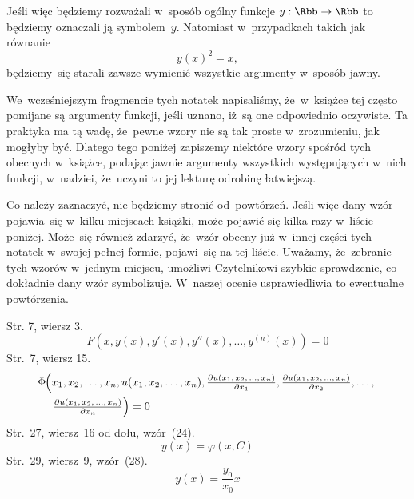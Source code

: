 \documentclass[a4paper,11pt]{article}
\numberwithin{equation}{section}
\begin{document}
Jeśli więc będziemy rozważali w~sposób ogólny funkcje
$y : \Rbb \to \Rbb$ to będziemy oznaczali ją symbolem~$y$. Natomiast
w~przypadkach takich jak równanie
\begin{equation}
  \label{eq:Uwagi-ogolne-03}
  y( x )^{ 2 } = x,
\end{equation}
będziemy~się starali zawsze wymienić wszystkie argumenty w~sposób jawny.

\VerSpaceFour





\noindent
We~wcześniejszym fragmencie tych notatek napisaliśmy, że~w~książce tej
często pomijane są argumenty funkcji, jeśli uznano, iż~są one odpowiednio
oczywiste. Ta praktyka ma tą wadę, że~pewne wzory nie są tak proste
w~zrozumieniu, jak mogłyby być. Dlatego tego poniżej zapiszemy niektóre
wzory spośród tych obecnych w~książce, podając jawnie argumenty wszystkich
występujących w~nich funkcji, w~nadziei, że~uczyni to jej lekturę odrobinę
łatwiejszą.

Co należy zaznaczyć, nie będziemy stronić od~powtórzeń. Jeśli więc dany
wzór pojawia~się w~kilku miejscach książki, może pojawić się kilka razy
w~liście poniżej. Może~się również zdarzyć, że~wzór obecny już w~innej
części tych notatek w~swojej pełnej formie, pojawi~się na tej liście.
Uważamy, że~zebranie tych wzorów w~jednym miejscu, umożliwi Czytelnikowi
szybkie sprawdzenie, co dokładnie dany wzór symbolizuje. W~naszej ocenie
usprawiedliwia to ewentualne powtórzenia.

\VerSpaceTwo


\noindent
Str. 7, wiersz 3.
\begin{equation}
  \label{eq:Uwagi-ogolne-04}
  F\left( x, y( x ), y'( x ), y''( x ), \ldots, y^{ ( n ) }( x ) \right) = 0
\end{equation}
Str.~7, wiersz 15.
\begin{equation}
  \label{eq:Uwagi-ogolne-05}
  \begin{split}
    \Phi \hspace{-0.25em}
    &\left( x_{ 1 }, x_{ 2 }, \ldots, x_{ n },
      u( x_{ 1 }, x_{ 2 }, \ldots, x_{ n } ),
      \tfrac{ \partial u( x_{ 1 }, \, x_{ 2 }, \, \ldots, \, x_{ n } ) }{ \partial x_{ 1 } },
      \tfrac{ \partial u( x_{ 1 }, \, x_{ 2 }, \, \ldots, \, x_{ n } ) }{ \partial x_{ 2 } },
      \ldots, \right. \\
    &\hspace{0.6em}
      \left.
      \tfrac{ \partial u( x_{ 1 }, \, x_{ 2 }, \, \ldots, \, x_{ n } ) }{ \partial x_{ n } }
      \right) = 0
  \end{split}
\end{equation}
Str.~27, wiersz~16 od dołu, wzór~(24).
\begin{equation}
  \label{eq:Uwagi-ogolne-06}
  y( x ) = \varphi( x, C )
\end{equation}
Str.~29, wiersz~9, wzór~(28).
\begin{equation}
  \label{eq:Uwagi-ogolne-07}
  y( x ) = \frac{ y_{ 0 } }{ x_{ 0 } } x
\end{equation}
\end{document}
